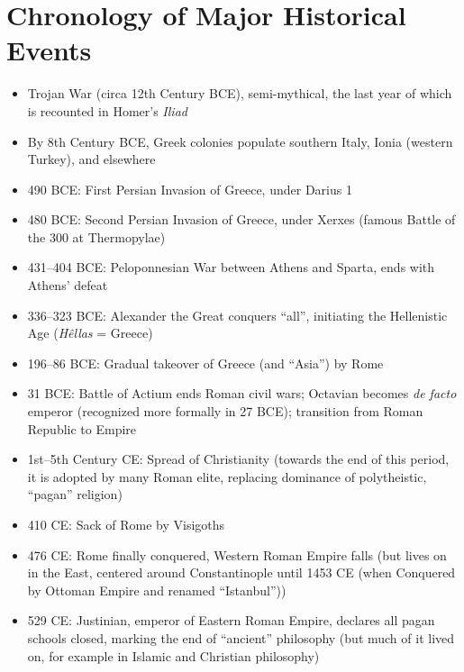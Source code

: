 \documentclass[11pt]{article}
\begin{document}
\section*{Chronology of Major Historical Events}
\begin{itemize}
\item{Trojan War (circa 12th Century BCE), semi-mythical, the last year of which is recounted in Homer's \emph{Iliad}}
\item{By 8th Century BCE, Greek colonies populate southern Italy, Ionia (western Turkey), and elsewhere}
\item{490 BCE: First Persian Invasion of Greece, under Darius 1}
\item{480 BCE: Second Persian Invasion of Greece, under Xerxes (famous Battle of the 300 at Thermopylae)}
\item{431--404 BCE: Peloponnesian War between Athens and Sparta, ends with Athens' defeat}
\item{336--323 BCE: Alexander the Great conquers ``all'', initiating the Hellenistic Age (\emph{H\^{e}llas} = Greece)}
\item{196--86 BCE: Gradual takeover of Greece (and ``Asia'') by Rome}
\item{31 BCE: Battle of Actium ends Roman civil wars; Octavian becomes \emph{de facto} emperor (recognized more formally in 27 BCE); transition from Roman Republic to Empire}
\item{1st--5th Century CE: Spread of Christianity (towards the end of this period, it is adopted by many Roman elite, replacing dominance of polytheistic, ``pagan'' religion)}
\item{410 CE: Sack of Rome by Visigoths}
\item{476 CE: Rome finally conquered, Western Roman Empire falls (but lives on in the East, centered around Constantinople until 1453 CE (when Conquered by Ottoman Empire and renamed ``Istanbul''))}
\item{529 CE: Justinian, emperor of Eastern Roman Empire, declares all pagan schools closed, marking the end of ``ancient'' philosophy (but much of it lived on, for example in Islamic and Christian philosophy)}
\end{itemize}
\end{document}
